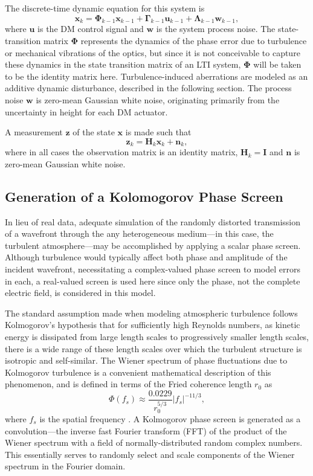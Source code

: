 \documentclass[11pt,reqno]{amsart}
\newcommand{\beq}{\begin{equation}}
\newcommand{\eeq}{\end{equation}}
\newcommand{\bsym}{\boldsymbol}
\newcommand{\mbf}{\mathbf}
\begin{document}
The discrete-time dynamic equation for this system is
\beq \mbf{x}_k = \bsym{\Phi}_{k-1}\mbf{x}_{k-1} + \bsym{\Gamma}_{k-1}\mbf{u}_{k-1} + \bsym{\Lambda}_{k-1}\mbf{w}_{k-1}, \eeq
where $\mbf{u}$ is the DM control signal and $\mbf{w}$ is the system process noise.  The state-transition matrix $\bsym{\Phi}$ represents the dynamics of the phase error due to turbulence or mechanical vibrations of the optics, but since it is not conceivable to capture these dynamics in the state transition matrix of an LTI system, $\bsym{\Phi}$ will be taken to be the identity matrix here.  Turbulence-induced aberrations are modeled as an additive dynamic disturbance, described in the following section.  The process noise $\mbf{w}$ is zero-mean Gaussian white noise, originating primarily from the uncertainty in height for each DM actuator.

A measurement $\mbf{z}$ of the state $\mbf{x}$ is made such that
\beq \mbf{z}_k = \mbf{H}_k\mbf{x}_k + \mbf{n}_k,\label{eq:WFS}\eeq
where in all cases the observation matrix is an identity matrix, $\mbf{H}_k = \mbf{I}$ and $\mbf{n}$ is zero-mean Gaussian white noise.

\subsection{Generation of a Kolomogorov Phase Screen}
In lieu of real data, adequate simulation of the randomly distorted transmission of a wavefront through the any heterogeneous medium---in this case, the turbulent atmosphere---may be accomplished by applying a scalar phase screen.  Although turbulence would typically affect both phase and amplitude of the incident wavefront, necessitating a complex-valued phase screen to model errors in each, a real-valued screen is used here since only the phase, not the complete electric field, is considered in this model.

The standard assumption made when modeling atmospheric turbulence follows Kolmogorov's hypothesis that for sufficiently high Reynolds numbers, as kinetic energy is dissipated from large length scales to progressively smaller length scales, there is a wide range of these length scales over which the turbulent structure is isotropic and self-similar.  The Wiener spectrum of phase fluctuations due to Kolmogorov turbulence is a convenient mathematical description of this phenomenon, and is defined in terms of the Fried coherence length $r_0$ as \beq \Phi(f_s) \approx \frac{0.0229}{r_0^{5/3}}|f_s|^{-11/3}, \eeq where $f_s$ is the spatial frequency \cite{Fried1965, Noll1976}.  A Kolmogorov phase screen is generated as a convolution---the inverse fast Fourier transform (FFT) of the product of the Wiener spectrum with a field of normally-distributed random complex numbers.  This essentially serves to randomly select and scale components of the Wiener spectrum in the Fourier domain.
\end{document}
